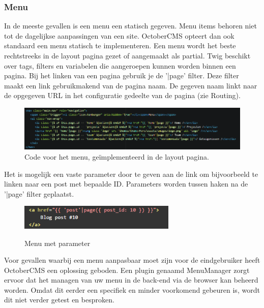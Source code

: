 \subsubsection{Menu}
In de meeste gevallen is een menu een statisch gegeven. Menu items behoren niet tot de dagelijkse aanpassingen van een site. OctoberCMS opteert dan ook standaard een menu statisch te implementeren. Een menu wordt het beste rechtstreeks in de layout pagina gezet of aangemaakt als partial.
\newline\newline
Twig beschikt over tags, filters en variabelen die aangeroepen kunnen worden binnen een pagina. Bij het linken van een pagina gebruik je de '|page' filter. Deze filter maakt een link gebruikmakend van de pagina naam. De gegeven naam linkt naar de opgegeven URL in het configuratie gedeelte van de pagina (zie Routing). 

\pagebreak

\begin{figure}[!ht]
  \includegraphics[width=\textwidth]{img/oc-menu.png}
  \centering
  \caption{Code voor het menu, geïmplementeerd in de layout pagina.}
  \label{fig:Menu}
\end{figure}

\noindent
Het is mogelijk een vaste parameter door te geven aan de link om bijvoorbeeld te linken naar een post met bepaalde ID. Parameters worden tussen haken na de '|page' filter geplaatst.

\begin{figure}[!ht]
  \includegraphics[width=75mm]{img/oc-menu-parameter.png}
  \centering
  \caption{Menu met parameter}
  \label{fig:Menu met parameter}
  \citep{BobkovAlexey2016OctoberCMSDocumentation}
\end{figure}

\noindent
Voor gevallen waarbij een menu aanpasbaar moet zijn voor de eindgebruiker heeft OctoberCMS een oplossing geboden. Een plugin genaamd MenuManager zorgt ervoor dat het managen van uw menu in de back-end via de browser kan beheerd worden. Omdat dit eerder een specifiek en minder voorkomend gebeuren is, wordt dit niet verder getest en besproken.

